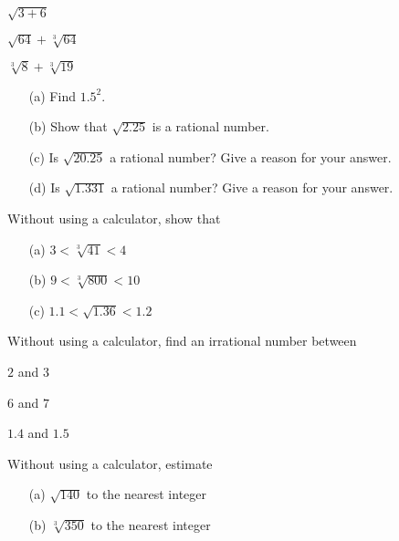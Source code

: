 \begin{multicols}{2}
\begin{uzd}
\begin{multicols}{2}
 $\sqrt{3+6}$

 $\sqrt{64} + \sqrt[3]{64}$

 $\sqrt[3]{8} + \sqrt[3]{19}$
\end{multicols}
\end{uzd}

\begin{uzd}
\phantom{a}

\begin{itemize}
\item[(a)] Find $1.5^2$.
\item[(b)] Show that $\sqrt{2.25}$ is a rational number.
\item[(c)] Is $\sqrt{20.25}$ a rational number? Give a reason for your answer.
\item[(d)] Is $\sqrt{1.331}$ a rational number? Give a reason for your answer.
\end{itemize}
\end{uzd}

\begin{uzd}
Without using a calculator, show that

\begin{itemize}
\item[(a)] $3 < \sqrt[3]{41} < 4$  
\item[(b)] $9 < \sqrt[3]{800} < 10$  
\item[(c)] $1.1 < \sqrt{1.36} < 1.2$
\end{itemize}
\end{uzd}



\begin{uzd}
Without using a calculator, find an irrational number between

\resetcolumnrule
\begin{multicols}{3}
 $2$ and $3$

 $6$ and $7$

 $1.4$ and $1.5$
\end{multicols}
\end{uzd}


\begin{uzd}
Without using a calculator, estimate

\begin{itemize}
\item[(a)] $\sqrt{140}$ to the nearest integer  

\item[(b)] $\sqrt[3]{350}$ to the nearest integer
\end{itemize}
\end{uzd}


\end{multicols}
